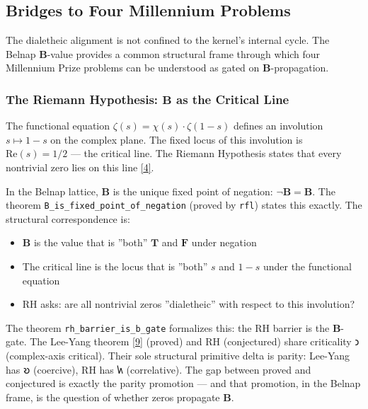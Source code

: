 \documentclass[10pt,a4paper]{article}
\begin{document}
\subsection{Bridges to Four Millennium Problems}

The dialetheic alignment is not confined to the kernel's internal cycle. The Belnap $\mathbf{B}$-value provides a common structural frame through which four Millennium Prize problems can be understood as gated on $\mathbf{B}$-propagation.

\subsubsection{The Riemann Hypothesis: $\mathbf{B}$ as the Critical Line}

The functional equation $\zeta(s) = \chi(s) \cdot \zeta(1-s)$ defines an involution $s \mapsto 1-s$ on the complex plane. The fixed locus of this involution is $\text{Re}(s) = 1/2$ --- the critical line. The Riemann Hypothesis states that every nontrivial zero lies on this line \href{}{{[}4{]}}.

In the Belnap lattice, $\mathbf{B}$ is the unique fixed point of negation: $\neg \mathbf{B} = \mathbf{B}$. The theorem \texttt{B\_\allowbreak is\_\allowbreak fixed\_\allowbreak point\_\allowbreak of\_\allowbreak negation} (proved by \texttt{rfl}) states this exactly. The structural correspondence is:

\begin{itemize}
    \item $\mathbf{B}$ is the value that is ''both'' $\mathbf{T}$ and $\mathbf{F}$ under negation
    \item The critical line is the locus that is ''both'' $s$ and $1-s$ under the functional equation
    \item RH asks: are all nontrivial zeros ''dialetheic'' with respect to this involution?
\end{itemize}

The theorem \texttt{rh\_\allowbreak barrier\_\allowbreak is\_\allowbreak b\_\allowbreak gate} formalizes this: the RH barrier is the $\mathbf{B}$-gate. The Lee-Yang theorem \href{}{{[}9{]}} (proved) and RH (conjectured) share criticality 𐑮 (complex-axis critical). Their sole structural primitive delta is parity: Lee-Yang has 𐑹 (coercive), RH has 𐑿 (correlative). The gap between proved and conjectured is exactly the parity promotion --- and that promotion, in the Belnap frame, is the question of whether zeros propagate $\mathbf{B}$.
\end{document}
